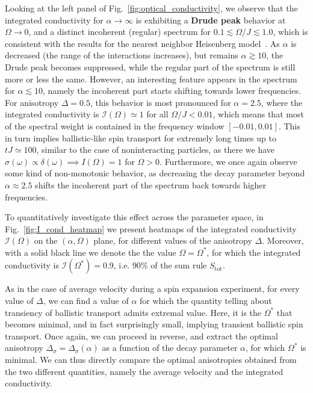 Looking at the left panel of Fig.~\ref{fig:optical_conductivity}, we observe that the integrated conductivity
for \(\alpha \to \infty\) is exhibiting a \textbf{Drude peak} behavior at \(\Omega \to 0\), and a distinct 
incoherent (regular) spectrum for \(0.1 \lesssim \Omega / J \lesssim 1.0\), which is consistent with the results
for the nearest neighbor Heisenberg model~\autocite{Prelovsek2021}. As \(\alpha\) is decreased 
(the range of the interactions increases), but remains \(\alpha \gtrsim 10\), the Drude peak
becomes suppressed, while the regular part of the spectrum is still more or less the same.
However, an interesting feature appears in the spectrum for \(\alpha \lesssim 10\), namely
the incoherent part starts shifting towards lower frequencies. For anisotropy \(\Delta = 0.5\),
this behavior is most pronounced for \(\alpha = 2.5\), where the integrated conductivity
is \(\mathcal{I}(\Omega)\simeq 1 \) for all \( \Omega/J < 0.01\), which means that most of the spectral weight
is contained in the frequency window \(\left[-0.01,0.01\right]\). This in turn implies ballistic-like 
spin transport for extremely long times up to \(tJ \simeq 100\), similar to the case of noninteracting particles,
as there we have \(\sigma(\omega) \propto \delta(\omega) \implies I(\Omega) = 1\) for \(\Omega > 0\). Furthermore,
we once again observe some kind of non-monotonic behavior, as decreasing the decay parameter
beyond \(\alpha \approx 2.5\) shifts the incoherent part of the spectrum back towards higher frequencies.

To quantitatively investigate this effect across the parameter space, in Fig.~\ref{fig:I_cond_heatmap}
we present heatmaps of the integrated conductivity \(\mathcal{I}(\Omega)\) on the \((\alpha ,\Omega)\) plane, 
for different values of the anisotropy \(\Delta\). Moreover, with a solid black line we denote the
the value \(\Omega = \Omega^{\ast}\), for which the integrated conductivity is \(\mathcal{I}(\Omega^{\ast}) = 0.9\),
i.e. 90\% of the sum rule \(S_{\mathrm{tot}}\).


As in the case of average velocity during a spin expansion experiment, 
for every value of \(\Delta\), we can find a value of \(\alpha\) for which the quantity telling about transiency
of ballistic transport admits extremal value. Here, it is the \(\Omega^{\ast}\) that becomes minimal,
and in fact surprisingly small, implying transient ballistic spin transport. Once again, we can proceed 
in reverse, and extract the optimal anisotropy \(\Delta_{\sigma} = \Delta_{\sigma}(\alpha)\) as a function
of the decay parameter \(\alpha\), for which \(\Omega^{\ast}\) is minimal. We can thus directly compare
the optimal anisotropies obtained from the two different quantities, namely the average velocity and the integrated conductivity.

